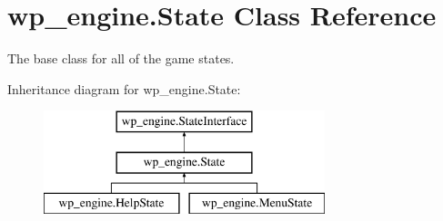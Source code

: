\hypertarget{classwp__engine_1_1_state}{\section{wp\-\_\-engine.\-State Class Reference}
\label{classwp__engine_1_1_state}
}


The base class for all of the game states.  


Inheritance diagram for wp\-\_\-engine.\-State\-:\begin{figure}[H]
\begin{center}
\leavevmode
\includegraphics[height=3.000000cm]{classwp__engine_1_1_state}
\end{center}
\end{figure}
